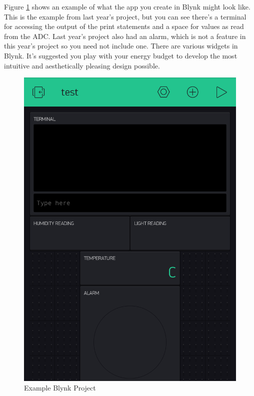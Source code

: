 \begin{multicols}{2}
Figure \ref{fig:blynkexample} shows an example of what the app you create in Blynk might look like. This is the example from last year's project, but you can see there's a terminal for accessing the output of the print statements and a space for values as read from the ADC. Last year's project also had an alarm, which is not a feature in this year's project so you need not include one. There are various widgets in Blynk. It's suggested you play with your energy budget to develop the most intuitive and aesthetically pleasing design possible.
\vfill\null
\columnbreak
\begin{figure}[H]
\centering
\includegraphics[width=0.75\columnwidth]{Figures/blynkexample}
\caption{Example Blynk Project}
\label{fig:blynkexample}
\end{figure}
\end{multicols}

